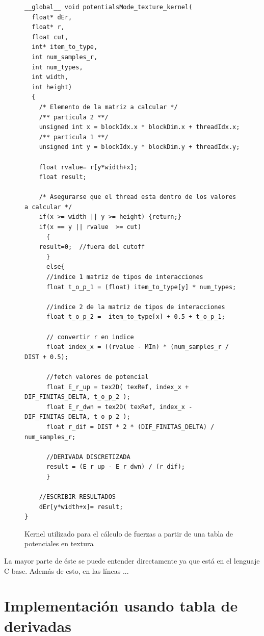 \begin{figure}[htbp]
    \begin{lstlisting}
__global__ void potentialsMode_texture_kernel(
  float* dEr,
  float* r, 
  float cut, 
  int* item_to_type, 
  int num_samples_r, 
  int num_types, 
  int width, 
  int height)
  {
    /* Elemento de la matriz a calcular */
    /** particula 2 **/
    unsigned int x = blockIdx.x * blockDim.x + threadIdx.x;	
    /** particula 1 **/
    unsigned int y = blockIdx.y * blockDim.y + threadIdx.y;
    
    float rvalue= r[y*width+x]; 
    float result;
    
    /* Asegurarse que el thread esta dentro de los valores a calcular */
    if(x >= width || y >= height) {return;}
    if(x == y || rvalue  >= cut) 
      {
	result=0;  //fuera del cutoff
      }
      else{
      //indice 1 matriz de tipos de interacciones
      float t_o_p_1 = (float) item_to_type[y] * num_types;	
      
      //indice 2 de la matriz de tipos de interacciones
      float t_o_p_2 =  item_to_type[x] + 0.5 + t_o_p_1;	
      
      // convertir r en indice
      float index_x = ((rvalue - MIn) * (num_samples_r / DIST + 0.5);	
      
      //fetch valores de potencial
      float E_r_up = tex2D( texRef, index_x + DIF_FINITAS_DELTA, t_o_p_2 );
      float E_r_dwn = tex2D( texRef, index_x - DIF_FINITAS_DELTA, t_o_p_2 );
      float r_dif = DIST * 2 * (DIF_FINITAS_DELTA) / num_samples_r;
      
      //DERIVADA DISCRETIZADA
      result = (E_r_up - E_r_dwn) / (r_dif); 
      }
   
    //ESCRIBIR RESULTADOS
    dEr[y*width+x]= result;
}
    \end{lstlisting}
    \caption{Kernel utilizado para el cálculo de fuerzas a partir de una tabla de potenciales en textura}
    \label{code:potentialsKernel}
\end{figure}

La mayor parte de éste se puede entender directamente ya que está en el lenguaje C base. Además de esto, en las líneas ...


\section{Implementación usando tabla de derivadas}


